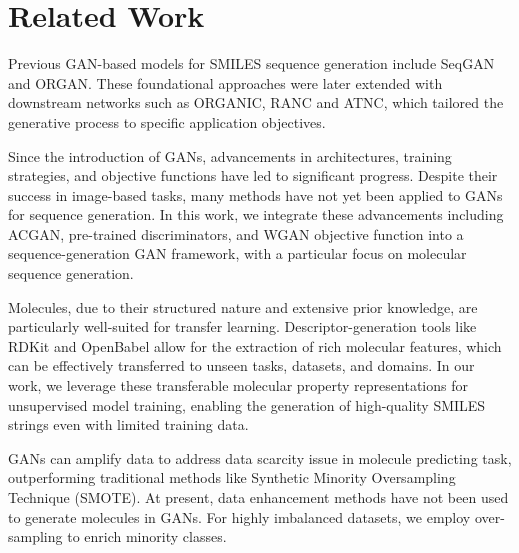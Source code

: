 \section{Related Work}
Previous GAN-based models for SMILES sequence generation include SeqGAN and ORGAN. These foundational approaches were later extended with downstream networks such as ORGANIC\cite{Sanchez-Lengeling2017}, RANC\cite{Putin2018a} and ATNC\cite{Putin2018b}, which tailored the generative process to specific application objectives. %

Since the introduction of GANs\cite{Goodfellow2020}, advancements in architectures\cite{Radford2015,Odena2016,Karras2018,Karras2021,Huang2025}, training strategies\cite{Karras2017}, and objective functions\cite{Durugkar2016,Arjovsky2017,Albuquerque2019,Kumari2021} have led to significant progress. Despite their success in image-based tasks, many methods have not yet been applied to GANs for sequence generation. In this work, we integrate these advancements including ACGAN, pre-trained discriminators, and WGAN objective function into a sequence-generation GAN framework, with a particular focus on molecular sequence generation.%

Molecules, due to their structured nature and extensive prior knowledge, are particularly well-suited for transfer learning. Descriptor-generation tools like RDKit\cite{rdkit} and OpenBabel\cite{O'Boyle2011} allow for the extraction of rich molecular features, which can be effectively transferred to unseen tasks, datasets, and domains. In our work, we leverage these transferable molecular property representations for unsupervised model training, enabling the generation of high-quality SMILES strings even with limited training data.

GANs can amplify data to address data scarcity issue in molecule predicting task\cite{arigye2020}, outperforming traditional methods like Synthetic Minority Oversampling Technique (SMOTE). At present, data enhancement methods have not been used to generate molecules in GANs. For highly imbalanced datasets, we employ over-sampling to enrich minority classes.